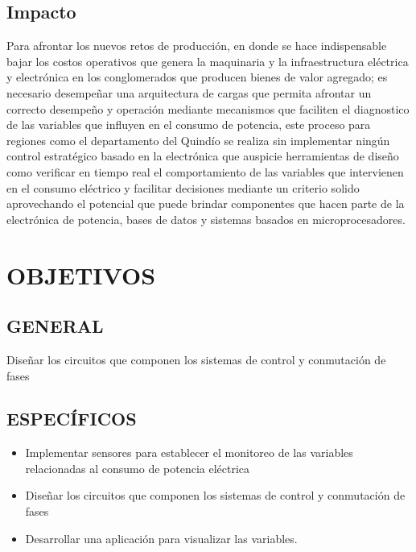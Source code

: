 \documentclass[12pt,letterpaper]{article}
\begin{document}
\subsection{Impacto}
Para afrontar los nuevos retos de producción, en donde se hace indispensable bajar los costos operativos que genera la maquinaria y la infraestructura eléctrica y electrónica en los conglomerados que producen bienes de valor agregado; es necesario desempeñar una arquitectura de cargas que permita afrontar un correcto desempeño y operación mediante mecanismos que faciliten el diagnostico de las variables que influyen en el consumo de potencia, este proceso para regiones como el departamento del Quindío se realiza sin implementar ningún control estratégico basado en la electrónica que auspicie herramientas de diseño como verificar en tiempo real el comportamiento de las variables que intervienen en el consumo eléctrico y facilitar decisiones mediante un criterio solido aprovechando el potencial que puede brindar componentes que hacen parte de la electrónica de potencia, bases de datos y sistemas basados en microprocesadores.\cite{pag1}\cite{UPMEii2016}\cite{BancoInteramericanodeDesarrollo2016}

\section{OBJETIVOS}
\subsection{GENERAL}
Diseñar los circuitos que componen los sistemas de control y conmutación de fases 

\subsection{ESPECÍFICOS}
\begin{itemize}
	\item Implementar sensores para establecer el monitoreo de las variables relacionadas al consumo de potencia eléctrica
	\item Diseñar los circuitos que componen los sistemas de control y conmutación de fases
	\item Desarrollar una aplicación para visualizar  las variables.
\end{itemize}
\end{document}
